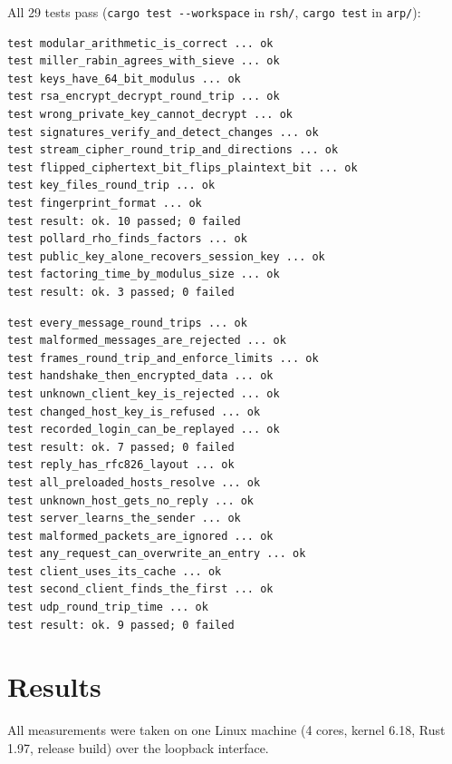 \documentclass[11pt,a4paper]{article}
\begin{document}
All 29 tests pass (\texttt{cargo test -{}-workspace} in \texttt{rsh/}, \texttt{cargo test} in \texttt{arp/}):

\noindent\begin{minipage}[t]{0.495\textwidth}
\begin{lstlisting}[style=plain,basicstyle=\ttfamily\fontsize{6.4}{7.8}\selectfont]
test modular_arithmetic_is_correct ... ok
test miller_rabin_agrees_with_sieve ... ok
test keys_have_64_bit_modulus ... ok
test rsa_encrypt_decrypt_round_trip ... ok
test wrong_private_key_cannot_decrypt ... ok
test signatures_verify_and_detect_changes ... ok
test stream_cipher_round_trip_and_directions ... ok
test flipped_ciphertext_bit_flips_plaintext_bit ... ok
test key_files_round_trip ... ok
test fingerprint_format ... ok
test result: ok. 10 passed; 0 failed
test pollard_rho_finds_factors ... ok
test public_key_alone_recovers_session_key ... ok
test factoring_time_by_modulus_size ... ok
test result: ok. 3 passed; 0 failed
\end{lstlisting}
\end{minipage}\hfill
\begin{minipage}[t]{0.495\textwidth}
\begin{lstlisting}[style=plain,basicstyle=\ttfamily\fontsize{6.4}{7.8}\selectfont]
test every_message_round_trips ... ok
test malformed_messages_are_rejected ... ok
test frames_round_trip_and_enforce_limits ... ok
test handshake_then_encrypted_data ... ok
test unknown_client_key_is_rejected ... ok
test changed_host_key_is_refused ... ok
test recorded_login_can_be_replayed ... ok
test result: ok. 7 passed; 0 failed
test reply_has_rfc826_layout ... ok
test all_preloaded_hosts_resolve ... ok
test unknown_host_gets_no_reply ... ok
test server_learns_the_sender ... ok
test malformed_packets_are_ignored ... ok
test any_request_can_overwrite_an_entry ... ok
test client_uses_its_cache ... ok
test second_client_finds_the_first ... ok
test udp_round_trip_time ... ok
test result: ok. 9 passed; 0 failed
\end{lstlisting}
\end{minipage}

\section{Results}

All measurements were taken on one Linux machine (4 cores, kernel 6.18, Rust
1.97, release build) over the loopback interface.
\end{document}

